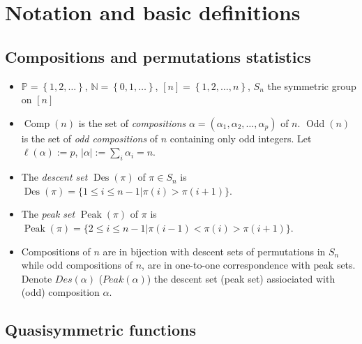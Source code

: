 \documentclass[numbers=enddot,12pt,final,onecolumn,notitlepage]{scrartcl}%
\newcommand{\al}{\alpha}
\newcommand{\NN}{\mathbb{N}} %
\newcommand{\PP}{\mathbb{P}} %
\newcommand{\Des}{\operatorname{Des}}
\newcommand{\Odd}{\operatorname{Odd}}
\newcommand{\Comp}{\operatorname{Comp}}
\newcommand{\Peak}{\operatorname{Peak}}
\newcommand{\defn}[1]{{\color{darkred}\emph{#1}}}
\newcommand{\0}{\phantom{c}}
\let\sumnonlimits\sum
\renewcommand{\sum}{\sumnonlimits\limits}
\begin{document}
\section{Notation and basic definitions}


\subsection{Compositions and permutations statistics}

\begin{itemize}
\item $\PP =\left\{1,2,\dots\right\}$, $\NN = \left\{0,1,\ldots\right\}$, $[n] = \left\{1,2,\dots, n\right\}$, $S_n$ the symmetric group on $[n]$

\item \defn{$\Comp(n)$} is the set of \defn{compositions} $\al = (\al_1, \al_2, \dots, \al_p)$ of $n$. \defn{$\Odd(n)$} is the set of \defn{odd compositions} of $n$ containing only odd integers.  Let $\ell(\al) := p$, $|\al| := \sum_i \al_i = n$.

\item The \defn{descent set} $\Des(\pi)$ of $\pi \in S_n$ is 
$\Des(\pi) = \{1\leq i\leq n-1| \pi(i)>\pi(i+1)\}.$


\item The \defn{peak set} $\Peak(\pi)$ of $\pi$ is $
\Peak(\pi) = \{2\leq i\leq n-1| \pi(i-1)<\pi(i)>\pi(i+1)\}.$

\item Compositions of $n$ are in bijection with descent sets of permutations in $S_n$ while odd compositions of $n$, are in one-to-one correspondence with peak sets. Denote \defn{$Des(\al)$} (\defn{$Peak(\al)$}) the descent set (peak set) assiociated with  (odd) composition $\al$.

\end{itemize}

\subsection{Quasisymmetric functions}
\end{document}
